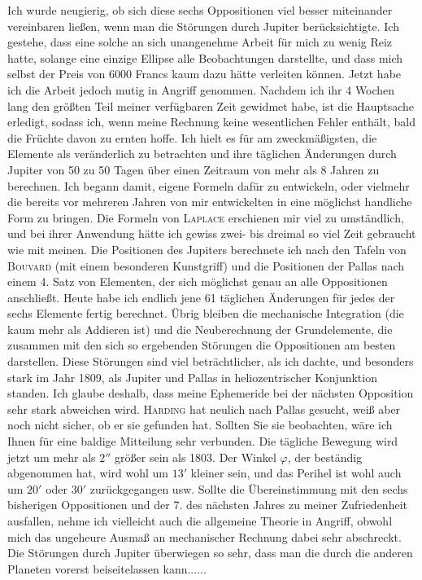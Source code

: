 \noindent\hspace*{\parindent}Ich wurde neugierig, ob sich diese sechs Oppositionen viel besser miteinander vereinbaren ließen, wenn man die Störungen durch Jupiter berücksichtigte. Ich gestehe, dass eine solche an sich unangenehme Arbeit für mich zu wenig Reiz hatte, solange eine einzige Ellipse alle Beobachtungen darstellte, und dass mich selbst der Preis von 6000 Francs kaum dazu hätte verleiten können. Jetzt habe ich die Arbeit jedoch mutig in Angriff genommen. Nachdem ich ihr 4 Wochen lang den größten Teil meiner verfügbaren Zeit gewidmet habe, ist die Hauptsache erledigt, sodass ich, wenn meine Rechnung keine wesentlichen Fehler enthält, bald die Früchte davon zu ernten hoffe. Ich hielt es für am zweckmäßigsten, die Elemente als veränderlich zu betrachten und ihre täglichen Änderungen durch Jupiter von 50 zu 50 Tagen über einen Zeitraum von mehr als 8 Jahren zu berechnen. Ich begann damit, eigene Formeln dafür zu entwickeln, oder vielmehr die bereits vor mehreren Jahren von mir entwickelten in eine möglichst handliche Form zu bringen. Die Formeln von \textsc{Laplace} erschienen mir viel zu umständlich, und bei ihrer Anwendung hätte ich gewiss zwei- bis dreimal so viel Zeit gebraucht wie mit meinen. Die Positionen des Jupiters berechnete ich nach den Tafeln von \textsc{Bouvard} (mit einem besonderen Kunstgriff\HistoricalNoteDouble{Vgl. S. 475 dieses Bandes.]}) und die Positionen der Pallas nach einem 4. Satz von Elementen, der sich möglichst genau an alle Oppositionen anschließt. Heute habe ich endlich jene 61 täglichen Änderungen für jedes der sechs Elemente fertig berechnet. Übrig bleiben die mechanische Integration (die kaum mehr als Addieren ist) und die Neuberechnung der Grundelemente, die zusammen mit den sich so ergebenden Störungen die Oppositionen am besten darstellen. Diese Störungen sind viel beträchtlicher, als ich dachte, und besonders stark im Jahr 1809, als Jupiter und Pallas in heliozentrischer Konjunktion standen. Ich glaube deshalb, dass meine Ephemeride bei der nächsten Opposition sehr stark abweichen wird. \textsc{Harding} hat neulich nach Pallas gesucht, weiß aber noch nicht sicher, ob er sie gefunden hat. Sollten Sie sie beobachten, wäre ich Ihnen für eine baldige Mitteilung sehr verbunden. Die tägliche Bewegung wird jetzt um mehr als \(2''\) größer sein als 1803. Der Winkel \(\varphi\), der beständig abgenommen hat, wird wohl um \(13'\) kleiner sein, und das Perihel ist wohl auch um \(20'\) oder \(30'\) zurückgegangen usw. Sollte die Übereinstimmung mit den sechs bisherigen Oppositionen und der 7. des nächsten Jahres zu meiner Zufriedenheit ausfallen, nehme ich vielleicht auch die allgemeine Theorie in Angriff, obwohl mich das ungeheure Ausmaß an mechanischer Rechnung dabei sehr abschreckt. Die Störungen durch Jupiter überwiegen so sehr, dass man die durch die anderen Planeten vorerst beiseitelassen kann.\quad\mbox{.\quad.\quad.\quad.\quad.}
